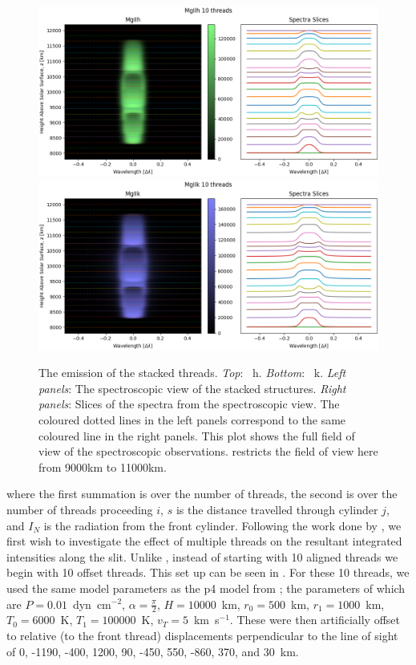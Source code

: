 \begin{figure}
    \includegraphics[width=\linewidth]{./03Modelling2D/figs/Offset/MgIIh.png}
    \includegraphics[width=\linewidth]{./03Modelling2D/figs/Offset/MgIIk.png}
    \caption[The emission of the stacked threads.]{The emission of the stacked threads. \textit{Top}: \mgii~h. \textit{Bottom}: \mgii~k. \textit{Left panels}: The spectroscopic view of the stacked structures. \textit{Right panels}: Slices of the spectra from the spectroscopic view. The coloured dotted lines in the left panels correspond to the same coloured line in the right panels. This plot shows the full field of view of the spectroscopic observations.  restricts the field of view here from 9000km to 11000km.}
    \label{fig:stackedspectra}
\end{figure}
where the first summation is over the number of threads, the second is over the number of threads proceeding $i$, $s$ is the distance travelled through cylinder $j$, and $I_N$ is the radiation from the front cylinder. Following the work done by \cite{labrosse_radiative_2016}, we first wish to investigate the effect of multiple threads on the resultant integrated \mgiihk{} intensities along the slit. Unlike \cite{labrosse_radiative_2016}, instead of starting with 10 aligned threads we begin with 10 offset threads. This set up can be seen in .
For these 10 threads, we used the same model parameters as the p4 model from \cite{labrosse_radiative_2016}; the parameters of which are $P=0.01$~dyn~cm$^{-2}$, $\alpha=\frac{\pi}{2}$, $H=10000$~km, $r_0=500$~km, $r_1=1000$~km, $T_0=6000$~K, $T_1=100000$~K, $v_T=5$~km~s$^{-1}$. These were then artificially offset to relative (to the front thread) displacements perpendicular to the line of sight of 0, -1190, -400, 1200, 90, -450, 550, -860, 370, and 30~km.

